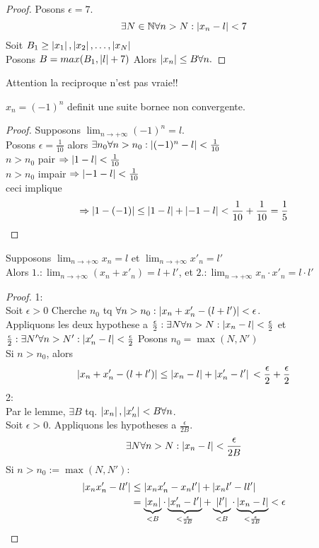 \documentclass[../main.tex]{subfiles}
\begin{document}
\begin{proof}
Posons $\epsilon =7$.
\[ 
	\exists N \in \mathbb{N}\forall n >N: \left\vert x_n-l\right\vert <7
\]
Soit $ B_1 \geq \left\vert x_1\right\vert, \left\vert x_2\right\vert, \ldots, \left\vert x_N\right\vert$\\
Posons $B=max(B_1,\left\vert l\right\vert +7)$
Alors $\left\vert x_n\right\vert \leq B \forall n.$

\end{proof}
Attention la reciproque n'est pas vraie!!
\begin{exemple}
	$x_n = ( -1)^{n}$ definit une suite bornee non convergente.
\end{exemple}
\begin{proof}
	Supposons $ \lim_{n \to  + \infty} (-1)^{n} = l$.\\
	Posons $\epsilon = \frac{1}{10}$ alors $\exists n_0 \forall n> n_0: \left\vert(-1)^{n} -l\right\vert< \frac{1}{10}$\\
	$n> n_0$ pair $\Rightarrow \left\vert1-l\right\vert < \frac{1}{10}$ \\
	$n> n_0$ impair $\Rightarrow \left\vert-1-l\right\vert < \frac{1}{10}$ \\
	ceci implique
	\[ 
		\Rightarrow \left\vert1 -(-1)\right\vert \leq \left\vert1-l\right\vert + \left\vert-1-l\right\vert < \frac{1}{10} + \frac{1}{10} = \frac{1}{5}
	\]

\end{proof}
\begin{propo}
Supposons $ \lim_{n \to  + \infty} x_n =l$ et $\lim_{n \to  + \infty} x'_n = l'$ \\
Alors $1.: \lim_{n \to  + \infty} (x_n + x'_n) = l+l'$, et
$2.:\lim_{n \to  + \infty} x_n \cdot x'_n = l\cdot l'$
\end{propo}
\begin{proof}
1:\\
Soit $\epsilon>0$ Cherche $ n_0$ tq $\forall n>n_0: \left\vert x_n + x'_n - ( l+l')\right\vert< \epsilon$.\\
Appliquons les deux hypothese a $\frac{\epsilon}{2}: \exists N \forall n>N: \left\vert x_n -l\right\vert < \frac{\epsilon}{2}$ et\\
$\frac{\epsilon}{2}: \exists N' \forall n>N': \left\vert x'_n -l\right\vert < \frac{\epsilon}{2}$
Posons $ n_0= \max(N,N')$\\
Si $n>n_0$, alors
\[ 
	\left\vert x_n + x'_n - ( l+l')\right\vert \leq \left\vert x_n -l\right\vert + \left\vert x'_n -l'\right\vert\\
	< \frac{\epsilon}{2} + \frac{\epsilon}{2}
\]
2:\\
Par le lemme, $\exists B$ tq. $\left\vert x_n\right\vert, \left\vert x'_n\right\vert < B \forall n$.\\
Soit $\epsilon >0$. Appliquons les hypotheses a $\frac{\epsilon}{2B}$.
\[ 
	\exists N \forall n>N: \left\vert x_n-l\right\vert < \frac{\epsilon}{2B}
\]
Si $n>n_0:=\max(N,N'):$
\begin{align*}
	\left\vert x_nx'_n - ll'\right\vert &\leq \left\vert x_nx'_n - x_nl'\right\vert + \left\vert x_nl' - ll'\right\vert\\
			    &= \underbrace{\left\vert x_n\right\vert}_{<B} \cdot \underbrace{\left\vert x'_n - l'\right\vert}_{<\frac{\epsilon}{2B}} + \underbrace{\left\vert l'\right\vert}_{<B} \cdot \underbrace{\left\vert x_n - l\right\vert}_{< \frac{\epsilon}{2B}} < \epsilon
\end{align*}


\end{proof}
\end{document}
